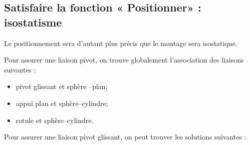 \documentclass[11pt,oneside]{article}
\begin{document}
\subsection{Satisfaire la fonction « Positionner» : isostatisme}
Le positionnement sera d'autant plus précis que le montage sera isostatique.

Pour assurer une liaison pivot, on trouve globalement l'association des liaisons suivantes : 
\begin{itemize}
\item pivot glissant et sphère --plan;
\item appui plan et sphère--cylindre;
\item rotule et sphère--cylindre.
\end{itemize}

Pour assurer une liaison pivot glissant, on peut trouver les solutions suivantes : 
\vspace{.5cm}
\end{document}
